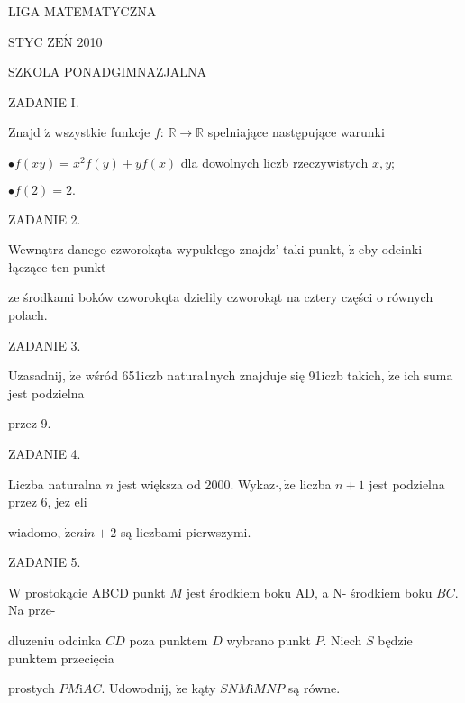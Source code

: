 \documentclass[a4paper,12pt]{article}
\begin{document}
LIGA MATEMATYCZNA

STYC Z$\mathrm{E}\acute{\mathrm{N}}$ 2010

SZKOLA PONADGIMNAZJALNA

ZADANIE I.

Znajd $\acute{\mathrm{z}}$ wszystkie funkcje $f$: $\mathbb{R}\rightarrow \mathbb{R}$ spelniające następujące warunki

$\bullet f(xy)=x^{2}f(y)+yf(x)$ dla dowolnych liczb rzeczywistych $x, y$;

$\bullet f(2)=2.$

ZADANIE 2.

Wewnątrz danego czworokąta wypukłego znajdz' taki punkt, $\dot{\mathrm{z}}$ eby odcinki łączące ten punkt

ze środkami boków czworokqta dzielily czworokąt na cztery części o równych polach.

ZADANIE 3.

Uzasadnij, $\dot{\mathrm{z}}\mathrm{e}$ wśród 651iczb natura1nych znajduje się 91iczb takich, $\dot{\mathrm{z}}\mathrm{e}$ ich suma jest podzielna

przez 9.

ZADANIE 4.

Liczba naturalna $n$ jest większa od 2000. Wykaz$\cdot, \dot{\mathrm{z}}\mathrm{e}$ liczba $n+1$ jest podzielna przez 6, $\mathrm{j}\mathrm{e}\dot{\mathrm{z}}$ eli

wiadomo, $\dot{\mathrm{z}}\mathrm{e}n\mathrm{i}n+2$ są liczbami pierwszymi.

ZADANIE 5.

$\mathrm{W}$ prostokącie ABCD punkt $M$ jest środkiem boku AD, a N- środkiem boku $BC$. Na prze-

dluzeniu odcinka $CD$ poza punktem $D$ wybrano punkt $P$. Niech $S$ będzie punktem przecięcia

prostych $PM\mathrm{i}AC$. Udowodnij, $\dot{\mathrm{z}}\mathrm{e}$ kąty $SNM\mathrm{i}MNP$ są równe.
\end{document}
